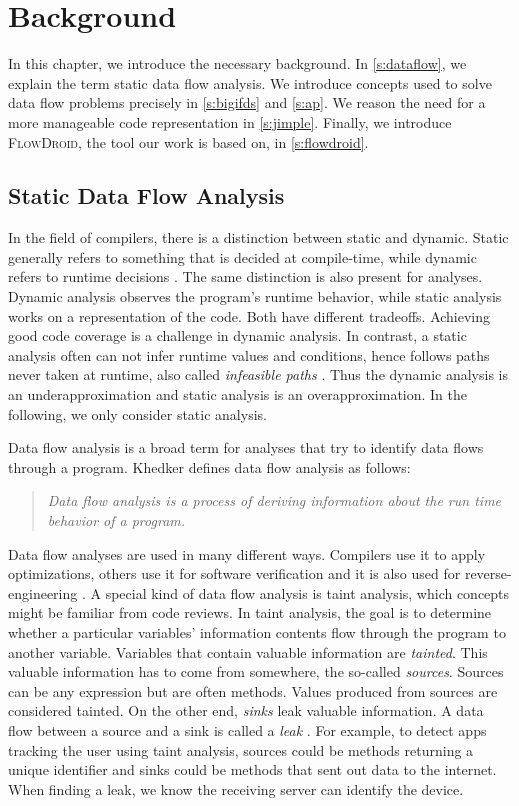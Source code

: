 \documentclass[../draft.tex]{subfiles}
\begin{document}
    \chapter{Background}
    In this chapter, we introduce the necessary background. 
    In \autoref{s:dataflow}, we explain the term static data flow analysis. 
    We introduce concepts used to solve data flow problems precisely in \autoref{s:bigifds} and \autoref{s:ap}. 
    We reason the need for a more manageable code representation in \autoref{s:jimple}.
    Finally, we introduce \textsc{FlowDroid}, the tool our work is based on, in \autoref{s:flowdroid}.

    \section{Static Data Flow Analysis}\label{s:dataflow}
    In the field of compilers, there is a distinction between static and dynamic. 
    Static generally refers to something that is decided at compile-time, while dynamic refers to runtime decisions \cite{Aho1986}. 
    The same distinction is also present for analyses. 
    Dynamic analysis observes the program's runtime behavior, while static analysis works on a representation of the code. 
    Both have different tradeoffs. 
    Achieving good code coverage is a challenge in dynamic analysis. 
    In contrast, a static analysis often can not infer runtime values and conditions, hence follows paths never taken at runtime, also called \textit{infeasible paths} \cite{Arzt2017PhD}.
    Thus the dynamic analysis is an underapproximation and static analysis is an overapproximation. 
    In the following, we only consider static analysis.

    Data flow analysis is a broad term for analyses that try to identify data flows through a program. 
    Khedker \cite{Khedker2009} defines data flow analysis as follows:
    \begin{quote}
        \textit{Data flow analysis is a process of deriving information about the run time behavior of a program.}
    \end{quote}
    Data flow analyses are used in many different ways. 
    Compilers use it to apply optimizations, others use it for software verification and it is also used for reverse-engineering \cite{Khedker2009}. 
    A special kind of data flow analysis is taint analysis, which concepts might be familiar from code reviews. 
    In taint analysis, the goal is to determine whether a particular variables' information contents flow through the program to another variable. 
    Variables that contain valuable information are \textit{tainted}. 
    This valuable information has to come from somewhere, the so-called \textit{sources}. 
    Sources can be any expression but are often methods.
    Values produced from sources are considered tainted. 
    On the other end, \textit{sinks} leak valuable information. 
    A data flow between a source and a sink is called a \textit{leak} \cite{Arzt2017PhD}. 
    For example, to detect apps tracking the user using taint analysis, sources could be methods returning a unique identifier and sinks could be methods that sent out data to the internet. 
    When finding a leak, we know the receiving server can identify the device.
\end{document}
